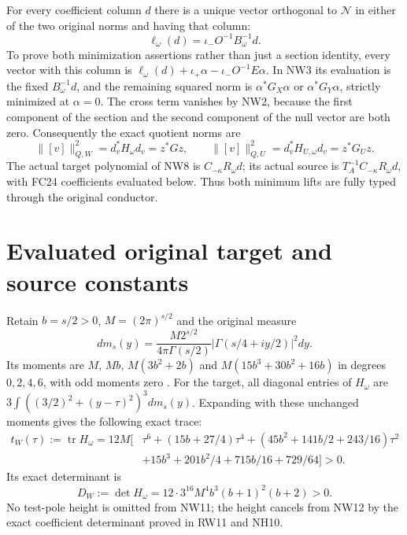 \documentclass[11pt]{article}
\newcommand{\tr}{\operatorname{tr}}
\begin{document}
For every coefficient column $d$ there is a unique vector
orthogonal to $\mathcal N$ in either of the two original
norms and having that column:
\[
 \ell_\omega(d)=\iota_-O^{-1}B_\omega^{-1}d.
 \tag{NW8}
\]
To prove both minimization assertions rather than just a
section identity, every vector with this column is
$\ell_\omega(d)+\iota_+\alpha-\iota_-O^{-1}E\alpha$.
In NW3 its evaluation is the fixed $B_\omega^{-1}d$,
and the remaining squared norm is $\alpha^*G_X\alpha$
or $\alpha^*G_Y\alpha$, strictly minimized at $\alpha=0$.
The cross term vanishes by NW2, because the first component
of the section and the second component of the null vector
are both zero. Consequently the exact quotient norms are
\[
 \|[v]\|_{Q,W}^2=d_v^*H_\omega d_v=z^*Gz,
 \qquad
 \|[v]\|_{Q,U}^2=d_v^*H_{U,\omega}d_v=z^*G_Uz.
 \tag{NW9}
\]
The actual target polynomial of NW8 is
$C_{-\kappa}R_\omega d$; its actual source is
$T_A^{-1}C_{-\kappa}R_\omega d$, with FC24 coefficients
evaluated below. Thus both minimum lifts are fully typed
through the original conductor.

\section{Evaluated original target and source constants}
Retain $b=s/2>0$, $M=(2\pi)^{s/2}$ and the original
measure
\[
 dm_s(y)=\frac{M2^{s/2}}{4\pi\Gamma(s/2)}
                 |\Gamma(s/4+iy/2)|^2dy.
 \tag{NW10}
\]
Its moments are $M$, $Mb$, $M(3b^2+2b)$ and
$M(15b^3+30b^2+16b)$ in degrees $0,2,4,6$, with
odd moments zero \cite{WCF,Fable029}. For the target, all diagonal
entries of $H_\omega$ are
$3\int((3/2)^2+(y-\tau)^2)^3dm_s(y)$. Expanding with
these unchanged moments gives the following exact trace:
\[
\begin{aligned}
 t_W(\tau):=\tr H_\omega=12M\big[&\tau^6+(15b+27/4)\tau^4
 +(45b^2+141b/2+243/16)\tau^2\\
 &+15b^3+201b^2/4+715b/16+729/64\big]>0.
\end{aligned}\tag{NW11}
\]
Its exact determinant is
\[
 D_W:=\det H_\omega=12\cdot3^{16}M^4b^3(b+1)^2(b+2)>0.
 \tag{NW12}
\]
No test-pole height is omitted from NW11; the height cancels
from NW12 by the exact coefficient determinant proved in
RW11 and NH10.
\end{document}

